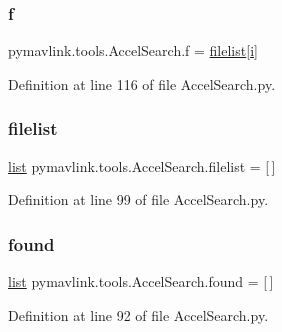 \subsubsection{\texorpdfstring{f}{f}}
{\footnotesize\ttfamily pymavlink.\+tools.\+Accel\+Search.\+f = \mbox{\hyperlink{namespacepymavlink_1_1tools_1_1AccelSearch_ab9d70abda8675fc388a6a5dd64e15911}{filelist}}\mbox{[}\mbox{\hyperlink{velTest_8cpp_a1239420b8759f52cbab64225b82461e2}{i}}\mbox{]}}



Definition at line 116 of file Accel\+Search.\+py.

\mbox{\label{namespacepymavlink_1_1tools_1_1AccelSearch_ab9d70abda8675fc388a6a5dd64e15911}} 
\subsubsection{\texorpdfstring{filelist}{filelist}}
{\footnotesize\ttfamily \mbox{\hyperlink{structlist}{list}} pymavlink.\+tools.\+Accel\+Search.\+filelist = \mbox{[}$\,$\mbox{]}}



Definition at line 99 of file Accel\+Search.\+py.

\mbox{\label{namespacepymavlink_1_1tools_1_1AccelSearch_a0bca2e9760b6a219df28ce13d7b480b0}} 
\subsubsection{\texorpdfstring{found}{found}}
{\footnotesize\ttfamily \mbox{\hyperlink{structlist}{list}} pymavlink.\+tools.\+Accel\+Search.\+found = \mbox{[}$\,$\mbox{]}}



Definition at line 92 of file Accel\+Search.\+py.

\mbox{\label{namespacepymavlink_1_1tools_1_1AccelSearch_a4d74e7e29e6b7f40261872ea8865404c}} 
